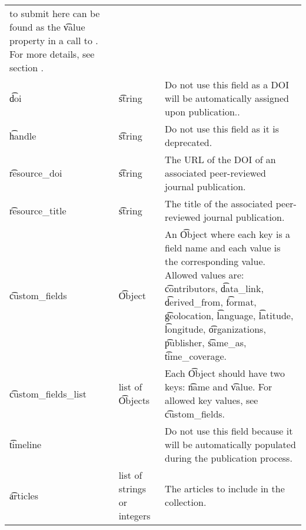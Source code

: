 \begin{tabularx}{\textwidth}{*{2}{!{\VRule[-1pt]}l}!{\VRule[-1pt]}X}
                                              to submit here can be found as
                                              the \t{value} property in a call
                                              to . For more
                                              details, see section
                                              .\\
  \t{doi}            & \t{string}           & Do not use this field as a DOI
                                              will be automatically assigned
                                              upon publication..\\
  \t{handle}         & \t{string}           & Do not use this field as it is
                                              deprecated.\\
  \t{resource\_doi}  & \t{string}           & The URL of the DOI of an
                                              associated peer-reviewed
                                              journal publication.\\
  \t{resource\_title} & \t{string}          & The title of the associated
                                              peer-reviewed journal
                                              publication.\\
  \t{custom\_fields} & \t{Object}           & An \t{Object} where each key is a
                                              field name and each value is the
                                              corresponding value. Allowed values
                                              are: \t{contributors}, \t{data\_link},
                                              \t{derived\_from}, \t{format},
                                              \t{geolocation}, \t{language},
                                              \t{latitude}, \t{longitude},
                                              \t{organizations}, \t{publisher},
                                              \t{same\_as}, \t{time\_coverage}.\\
  \t{custom\_fields\_list} & list of \t{Objects} & Each \t{Object} should have
                                              two keys: \t{name} and
                                              \t{value}. For allowed key values,
                                              see \t{custom\_fields}.\\
  \t{timeline}       &                      & Do not use this field because it
                                              will be automatically populated
                                              during the publication process.\\
  \t{articles}       & list of strings or integers & The articles to include
                                              in the collection.\\
\end{tabularx}

